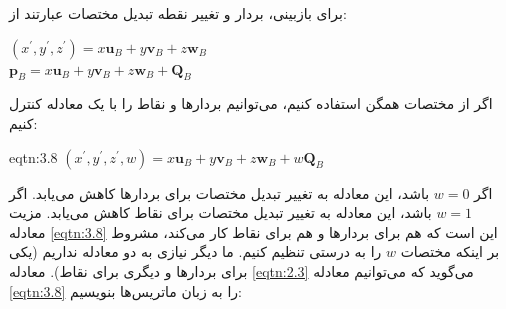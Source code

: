 {
    \Large
    \begin{spacing}{1.5}
        برای بازبینی، بردار و تغییر نقطه تبدیل مختصات عبارتند از:

        \begin{flushleft}
            $(x^\prime,y^\prime,z^\prime)=x\textbf{u}_{B}+y\textbf{v}_{B}+z\textbf{w}_{B}$ \\
            $\textbf{p}_{B}=x\textbf{u}_{B}+y\textbf{v}_{B}+z\textbf{w}_{B}+\textbf{Q}_{B}$ 
        \end{flushleft}

        اگر از مختصات همگن استفاده کنیم، می‌توانیم بردارها و نقاط را با یک معادله کنترل کنیم:

        \begin{eqtn}{eqtn:3.8}
            \centering
            $(x^\prime,y^\prime,z^\prime,w)=x\textbf{u}_{B}+y\textbf{v}_{B}+z\textbf{w}_{B}+w\textbf{Q}_{B}$
        \end{eqtn}

        اگر $w=0$ باشد، این معادله به تغییر تبدیل مختصات برای بردارها کاهش می‌یابد.
        اگر $w=1$ باشد، این معادله به تغییر تبدیل مختصات برای نقاط کاهش می‌یابد.
        مزیت معادله \ref{eqtn:3.8} این است که هم برای بردارها و هم برای نقاط کار می‌کند، مشروط بر اینکه مختصات $w$ را به درستی تنظیم کنیم.
        ما دیگر نیازی به دو معادله نداریم (یکی برای بردارها و دیگری برای نقاط). معادله \ref{eqtn:2.3} می‌گوید که می‌توانیم معادله \ref{eqtn:3.8} را به زبان ماتریس‌ها بنویسیم:


\end{spacing}}
